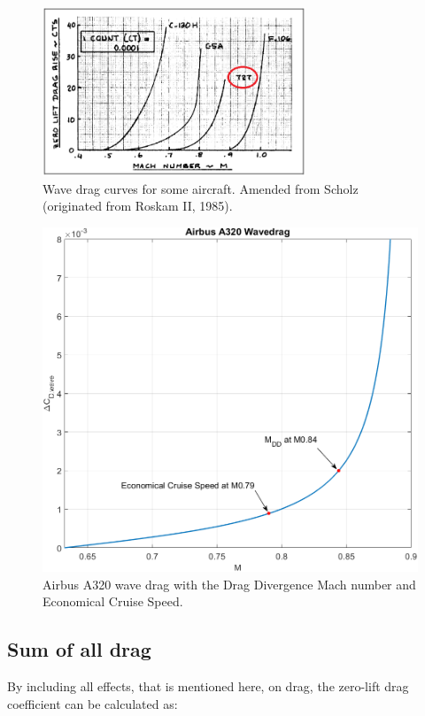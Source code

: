 \documentclass[english]{kththesis}
\begin{document}
\begin{figure}[hb]
    \centering
    \includegraphics[width=0.7\textwidth]{Epictures/Wave Drag Roskam 2.png}
    \caption{Wave drag curves for some aircraft. Amended from Scholz \cite{Scholz2017} (originated from Roskam II, 1985).}
    \label{fig:dCDwaveRoskam}
\end{figure}

\begin{figure}[hb]
    \centering
    \includegraphics[width=1\textwidth]{Epictures/A320WaveDrag.png}
    \caption{Airbus A320 wave drag with the Drag Divergence Mach number and Economical Cruise Speed.}
    \label{fig:dCDwaveA320}
\end{figure}

\clearpage


\subsection{Sum of all drag}
\label{sec:sumdrag}
By including all effects, that is mentioned here, on drag, the zero-lift drag coefficient can be calculated as:
\end{document}
